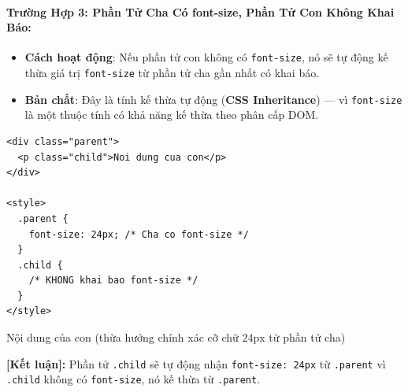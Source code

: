 \documentclass[11pt,oneside]{book}
\newcommand{\thd}[1]{\textcolor{white}{\textbf{\strut #1}}}
\newcommand{\codeinline}[1]{\textcolor{accentOrange}{\texttt{#1}}}
\newcommand{\term}[1]{\textbf{\textcolor{primaryBlue}{#1}}}
\begin{document}
\begin{prettyTableBox}
\sffamily\small
{}
\end{prettyTableBox}

\paragraph{Trường Hợp 3: Phần Tử Cha Có font-size, Phần Tử Con Không Khai Báo:}
\begin{itemize}[leftmargin=1.5em, itemsep=2pt, parsep=0pt]
    \item \textbf{Cách hoạt động}: Nếu phần tử con không có \codeinline{font-size}, nó sẽ tự động kế thừa giá trị \codeinline{font-size} từ phần tử cha gần nhất có khai báo.
    \item \textbf{Bản chất}: Đây là tính kế thừa tự động (\term{CSS Inheritance}) — vì \codeinline{font-size} là một thuộc tính có khả năng kế thừa theo phân cấp DOM.
\end{itemize}

\begin{codeWindow}
\begin{lstlisting}[language=HTML5]
<div class="parent">
  <p class="child">Noi dung cua con</p>
</div>

<style>
  .parent {
    font-size: 24px; /* Cha co font-size */
  }
  .child {
    /* KHONG khai bao font-size */
  }
</style>
\end{lstlisting}
\end{codeWindow}

\begin{browserWindow}
\sffamily\small
\begin{tcolorbox}[enhanced, colback=white, colframe=primaryBlue!20, arc=6pt, boxrule=0.8pt, top=8pt, bottom=8pt, left=12pt, right=12pt]
  {\fontsize{16pt}{20pt}\selectfont \textcolor{darkText}{Nội dung của con (thừa hưởng chính xác cỡ chữ $24\text{px}$ từ phần tử cha)}\par}
  \vspace{3pt}
  \textcolor{green!60!black}{\textbf{[Kết luận]:}} Phần tử \codeinline{.child} sẽ tự động nhận \codeinline{font-size: 24px} từ \codeinline{.parent} vì \codeinline{.child} không có \codeinline{font-size}, nó kế thừa từ \codeinline{.parent}.
\end{tcolorbox}
\end{browserWindow}
\end{document}
